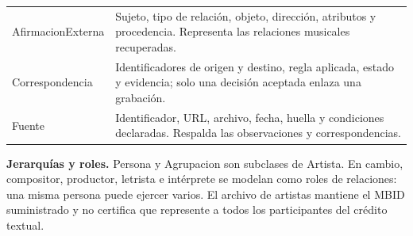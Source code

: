 \documentclass[11pt,a4paper]{article}
\begin{document}
\begin{center}
\begin{tabularx}{\linewidth}{@{}>{\raggedright\arraybackslash}p{3.5cm}Y@{}}
AfirmacionExterna & Sujeto, tipo de relación, objeto, dirección, atributos y procedencia. Representa las relaciones musicales recuperadas. \\
Correspondencia & Identificadores de origen y destino, regla aplicada, estado y evidencia; solo una decisión aceptada enlaza una grabación. \\
Fuente & Identificador, URL, archivo, fecha, huella y condiciones declaradas. Respalda las observaciones y correspondencias. \\
\bottomrule
\end{tabularx}
\end{center}

\textbf{Jerarquías y roles.} Persona y Agrupacion son subclases de Artista. En cambio, compositor, productor, letrista e intérprete se modelan como roles de relaciones: una misma persona puede ejercer varios. El archivo de artistas mantiene el MBID suministrado y no certifica que represente a todos los participantes del crédito textual.

\newpage
\end{document}
